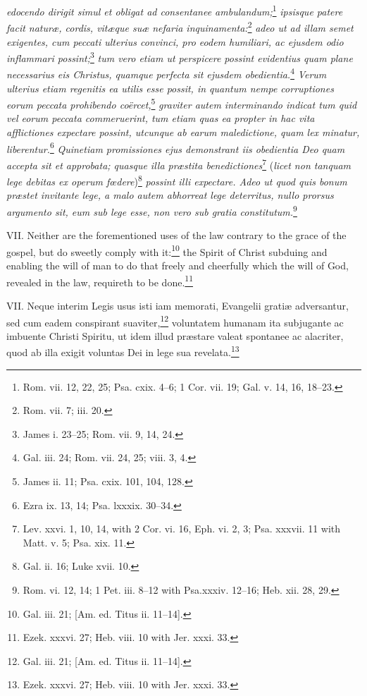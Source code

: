 \emph{edocendo dirigit simul et obligat ad consentanee ambulandum;}\footnote{Rom. vii. 12, 22, 25; Psa. cxix. 4–6; 1 Cor. vii. 19; Gal. v. 14, 16, 18–23.}\emph{ ipsisque patere facit naturæ, cordis, vitæque suæ nefaria inquinamenta:}\footnote{Rom. vii. 7; iii. 20.}\emph{ adeo ut ad illam semet exigentes, cum peccati ulterius convinci, pro eodem humiliari, ac ejusdem odio inflammari possint;}\footnote{James i. 23–25; Rom. vii. 9, 14, 24.}\emph{ tum vero etiam ut perspicere possint evidentius quam plane necessarius eis Christus, quamque perfecta sit ejusdem obedientia.}\footnote{Gal. iii. 24; Rom. vii. 24, 25; viii. 3, 4.}\emph{ Verum ulterius etiam regenitis ea utilis esse possit, in quantum nempe corruptiones eorum peccata prohibendo coërcet,}\footnote{James ii. 11; Psa. cxix. 101, 104, 128.}\emph{ graviter autem interminando indicat tum quid vel eorum peccata commeruerint, tum etiam quas ea propter in hac vita afflictiones expectare possint, utcunque ab earum maledictione, quam lex minatur, liberentur.}\footnote{Ezra ix. 13, 14; Psa. lxxxix. 30–34.}\emph{ Quinetiam promissiones ejus demonstrant iis obedientia Deo quam accepta sit et approbata; quasque illa præstita benedictiones}\footnote{Lev. xxvi. 1, 10, 14, with 2 Cor. vi. 16, Eph. vi. 2, 3; Psa. xxxvii. 11 with Matt. v. 5; Psa. xix. 11.} (\emph{licet non tanquam lege debitas ex operum fœdere})\footnote{Gal. ii. 16; Luke xvii. 10.}\emph{ possint illi expectare. Adeo ut quod quis bonum præstet invitante lege, a malo autem abhorreat lege deterritus, nullo prorsus argumento sit, eum sub lege esse, non vero sub gratia constitutum.}\footnote{Rom. vi. 12, 14; 1 Pet. iii. 8–12 with Psa.xxxiv. 12–16; Heb. xii. 28, 29.}

VII. Neither are the forementioned uses of the law contrary to the grace of the gospel, but do sweetly comply with it:\footnote{Gal. iii. 21; [Am. ed. Titus ii. 11–14].} the Spirit of Christ subduing and enabling the will of man to do that freely and cheerfully which the will of God, revealed in the law, requireth to be done.\footnote{Ezek. xxxvi. 27; Heb. viii. 10 with Jer. xxxi. 33.}

VII. Neque interim Legis usus isti iam memorati, Evangelii gratiæ adversantur, sed cum eadem conspirant suaviter,\footnote{Gal. iii. 21; [Am. ed. Titus ii. 11–14].} voluntatem humanam ita subjugante ac imbuente Christi Spiritu, ut idem illud præstare valeat spontanee ac alacriter, quod ab illa exigit voluntas Dei in lege sua revelata.\footnote{Ezek. xxxvi. 27; Heb. viii. 10 with Jer. xxxi. 33.}

